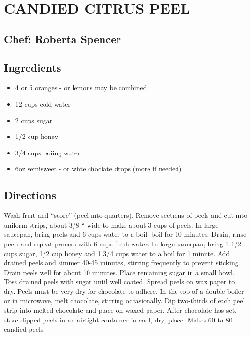 \documentclass[
]{book}
\providecommand{\tightlist}{%
  \setlength{\itemsep}{0pt}\setlength{\parskip}{0pt}}
\begin{document}
\hypertarget{candied-citrus-peel}{%
\section*{CANDIED CITRUS PEEL}\label{candied-citrus-peel}}


\hypertarget{chef-roberta-spencer-32}{%
\subsection*{Chef: Roberta Spencer}\label{chef-roberta-spencer-32}}


\hypertarget{ingredients-94}{%
\subsection*{Ingredients}\label{ingredients-94}}


\begin{itemize}
\tightlist
\item
  4 or 5 oranges - or lemons may be combined
\item
  12 cups cold water
\item
  2 cups sugar
\item
  1/2 cup honey
\item
  3/4 cups boiing water
\item
  6oz semisweet - or whte choclate drops (more if needed)
\end{itemize}

\hypertarget{directions-94}{%
\subsection*{Directions}\label{directions-94}}


Wash fruit and ``score'' (peel into quarters). Remove sections of peels and cut into uniform strips, about 3/8 `` wide to make about 3 cups of peels. In large saucepan, bring peels and 6 cups water to a boil; boil for 10 minutes. Drain, rinse peels and repeat process with 6 cups fresh water. In large saucepan, bring 1 1/2 cups sugar, 1/2 cup honey and 1 3/4 cups water to a boil for 1 minute. Add drained peels and simmer 40-45 minutes, stirring frequently to prevent sticking. Drain peels well for about 10 minutes. Place remaining sugar in a small bowl. Toss drained peels with sugar until well coated. Spread peels on wax paper to dry. Peels must be very dry for chocolate to adhere. In the top of a double boiler or in microwave, melt chocolate, stirring occasionally. Dip two-thirds of each peel strip into melted chocolate and place on waxed paper. After chocolate has set, store dipped peels in an airtight container in cool, dry, place. Makes 60 to 80 candied peels.
\end{document}
